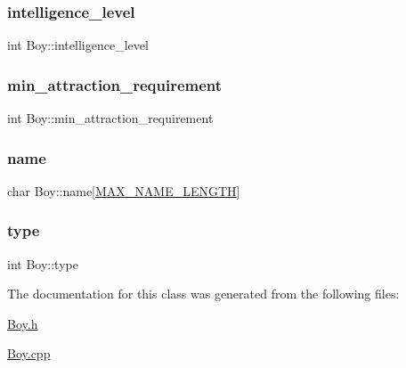 \mbox{\label{class_boy_a2974e9a9600a7d88256b159b868b80c0}} 
\subsubsection{\texorpdfstring{intelligence\+\_\+level}{intelligence\_level}}
{\footnotesize\ttfamily int Boy\+::intelligence\+\_\+level}

\mbox{\label{class_boy_a3b85e00dc9b5e1b67a6954a1230656c4}} 
\subsubsection{\texorpdfstring{min\+\_\+attraction\+\_\+requirement}{min\_attraction\_requirement}}
{\footnotesize\ttfamily int Boy\+::min\+\_\+attraction\+\_\+requirement}

\mbox{\label{class_boy_a3ceaefba33434bcf8ec3c88fc4622af8}} 
\subsubsection{\texorpdfstring{name}{name}}
{\footnotesize\ttfamily char Boy\+::name\mbox{[}\hyperlink{_girl_8h_a0c397a708cec89c74029582574516b30}{M\+A\+X\+\_\+\+N\+A\+M\+E\+\_\+\+L\+E\+N\+G\+TH}\mbox{]}}

\mbox{\label{class_boy_a1b907f52b73e8355ce0dd02db65afa4f}} 
\subsubsection{\texorpdfstring{type}{type}}
{\footnotesize\ttfamily int Boy\+::type}



The documentation for this class was generated from the following files\+:\begin{DoxyCompactItemize}
\item 
\hyperlink{_boy_8h}{Boy.\+h}\item 
\hyperlink{_boy_8cpp}{Boy.\+cpp}\end{DoxyCompactItemize}
